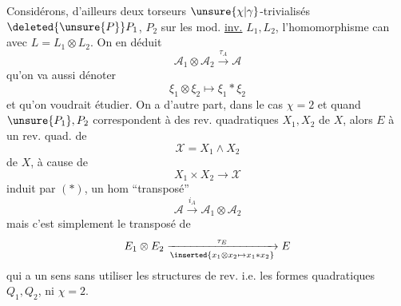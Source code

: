 Considérons, d'ailleurs deux torseurs $\unsure{\chi|\gamma}$-trivialisés $\deleted{\unsure{P}}P_1$, $P_2$ sur les mod. \uline{inv.} $L_1,L_2$, l'homomorphisme can
avec $L=L_1\otimes L_2$.
On en déduit
\[
\mathcal A_1\otimes\mathcal A_2\xrightarrow{\tau_A}\mathcal A
\]
qu'on va aussi dénoter
\[
\xi_1\otimes\xi_2\longmapsto\xi_1*\xi_2
\]
et qu'on voudrait étudier. On a d'autre part, dans le cas $\chi=2$ et quand $\unsure{P_1},P_2$ correspondent à des  rev. quadratiques $X_1,X_2$ de $X$, alors $E$ à un rev. quad. de 
\[
\mathcal X=X_1\wedge X_2
\]
de $X$, à cause de
\[
X_1\times X_2\longrightarrow\mathcal X
\]
induit par $(*)$, un hom ``transposé''
\[
\mathcal A\xrightarrow{i_A}\mathcal A_1\otimes\mathcal A_2
\]
mais c'est simplement le transposé de
\[
E_1\otimes E_2\xrightarrow[\inserted{x_1\otimes x_2\mapsto x_1*x_2}]{\tau_E}E
\]
qui a  un sens sans utiliser les structures de rev. i.e. les formes quadratiques $Q_1,Q_2$, ni  $\chi=2$.

